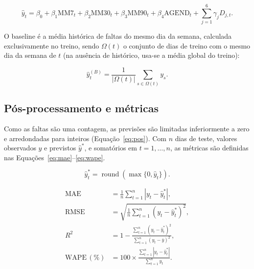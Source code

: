 \documentclass[11pt]{article}
\begin{document}
\begin{equation}
\hat{y}_t = \beta_0 + \beta_1\mathrm{MM7}_t + \beta_2\mathrm{MM30}_t + \beta_3\mathrm{MM90}_t + \beta_4\mathrm{AGEND}_t + \sum_{j=1}^{6}\gamma_j D_{j,t}.
\label{eq:modelo}
\end{equation}

O baseline é a média histórica de faltas do mesmo dia da semana, calculada exclusivamente no treino, sendo $\Omega(t)$ o conjunto de dias de treino com o mesmo dia da semana de $t$ (na ausência de histórico, usa-se a média global do treino):

\begin{equation}
\hat{y}_t^{(B)} = \frac{1}{|\Omega(t)|}\sum_{s\in\Omega(t)}y_s.
\label{eq:baseline}
\end{equation}

\subsection{Pós-processamento e métricas}

Como as faltas são uma contagem, as previsões são limitadas inferiormente a zero e arredondadas para inteiros (Equação~\ref{eq:pos}). Com $n$ dias de teste, valores observados $y$ e previstos $\hat{y}^{*}$, e somatórios em $t=1,\ldots,n$, as métricas são definidas nas Equações~\ref{eq:mae}--\ref{eq:wape}.

\begin{equation}
\hat{y}^{*}_t = \operatorname{round}\!\left(\max\{0,\hat{y}_t\}\right).
\label{eq:pos}
\end{equation}

\begin{subequations}\label{eq:metricas}
\begin{align}
\mathrm{MAE} &= \frac{1}{n}\sum_{t=1}^{n}|y_t-\hat{y}^{*}_t|, \label{eq:mae}\\
\mathrm{RMSE} &= \sqrt{\frac{1}{n}\sum_{t=1}^{n}(y_t-\hat{y}^{*}_t)^2}, \label{eq:rmse}\\
R^2 &= 1-\frac{\sum_{t=1}^{n}(y_t-\hat{y}^{*}_t)^2}{\sum_{t=1}^{n}(y_t-\bar{y})^2}, \label{eq:r2}\\
\mathrm{WAPE}\,(\%) &= 100\times\frac{\sum_{t=1}^{n}|y_t-\hat{y}^{*}_t|}{\sum_{t=1}^{n}y_t}. \label{eq:wape}
\end{align}
\end{subequations}
\end{document}

